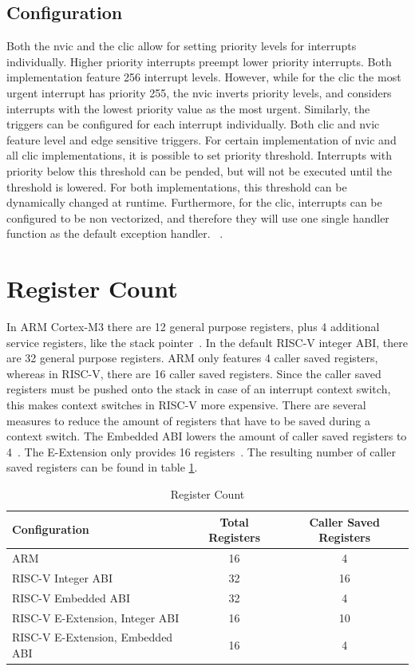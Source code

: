 \subsection{Configuration}
\label{sec:interrupt_configuration}
Both the \gls{nvic} and the \gls{clic} allow for setting priority levels for interrupts individually.
Higher priority interrupts preempt lower priority interrupts.
Both implementation feature 256 interrupt levels. However, while for the \gls{clic} the most urgent interrupt has priority 255, the \gls{nvic} inverts priority levels, and considers interrupts with the lowest priority value as the most urgent.
Similarly, the triggers can be configured for each interrupt individually. Both \gls{clic} and \gls{nvic} feature level and edge sensitive triggers. For certain implementation of \gls{nvic} and all \gls{clic} implementations, it is possible to set priority threshold. Interrupts with priority below this threshold can be pended, but will not be executed until the threshold is lowered. For both implementations, this threshold can be dynamically changed at runtime.
Furthermore, for the \gls{clic}, interrupts can be configured to be non vectorized, and therefore they will use one single handler function as the default exception handler. 
~\cite{NVIC}\cite{CLIC}.

\section{Register Count}
\label{sec:register_count}
In ARM Cortex-M3 there are 12 general purpose registers, plus 4 additional service registers, like the stack pointer~\cite{ARMRegisters}. In the default RISC-V integer ABI, there are 32 general purpose registers\cite{RISCVIntegerABI}. ARM only features 4 caller saved registers, whereas in RISC-V, there are 16 caller saved registers. Since the caller saved registers must be pushed onto the stack in case of an interrupt context switch, this makes context switches in RISC-V more expensive. There are several measures to reduce the amount of registers that have to be saved during a context switch. The Embedded ABI lowers the amount of caller saved registers to 4~\cite{RISCVEmbeddedABI}. The E-Extension only provides 16 registers~\cite{RISCVEExtension}. The resulting number of caller saved registers can be found in table \ref{tbl:register_counts}.

\begin{table}
  \centerfloat
  \begin{tabular}{ l c c }
    \toprule
    \textbf{Configuration} & \textbf{Total Registers} & \textbf{Caller Saved Registers} \\
    \midrule
    ARM & 16 & 4 \\
    RISC-V Integer ABI & 32 & 16 \\
    RISC-V Embedded ABI & 32 & 4 \\
    RISC-V E-Extension, Integer ABI & 16 & 10 \\
    RISC-V E-Extension, Embedded ABI & 16 & 4 \\
    \bottomrule
  \end{tabular}
  \caption{Register Count}%
  \label{tbl:register_counts}
\end{table}